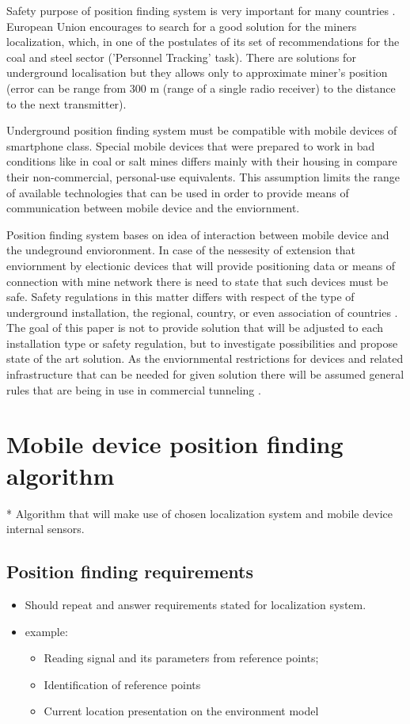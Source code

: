 \documentclass[../main.tex]{subfiles}
\begin{document}
Safety purpose of position finding system is very important for many countries \cite{positioning_tests}. European Union encourages to search for a good solution for the miners localization, which, in one of the postulates of its set of recommendations for the coal and steel sector ('Personnel Tracking' task). There are solutions for underground localisation but they allows only to approximate miner's position (error can be range from 300 m (range of a single radio receiver) to the distance to the next transmitter).

Underground position finding system must be compatible with mobile devices of smartphone class. Special mobile devices that were prepared to work in bad conditions like in coal or salt mines differs mainly with their housing in compare their non-commercial, personal-use equivalents. This assumption limits the range of available technologies that can be used in order to provide means of communication between mobile device and the enviornment.


Position finding system bases on idea of interaction between mobile device and the undeground envioronment. In case of the nessesity of extension that enviornment by electionic devices that will provide positioning data or means of connection with mine network there is need to state that such devices must be safe. Safety regulations in this matter differs with respect of the type of underground installation, the regional, country, or even association of countries \cite{Thesis_CM}. The goal of this paper is not to provide solution that will be adjusted to each installation type or safety regulation, but to investigate possibilities and propose state of the art solution. As the enviornmental restrictions for devices and related infrastructure that can be needed for given solution there will be assumed general rules that are being in use in commercial tunneling \cite{Thesis_CM}.



\chapter{Mobile device position finding algorithm}
* Algorithm that will make use of chosen localization system and mobile device internal sensors.

\section{Position finding requirements} %
\label{sec:position_finding_requirements}
\begin{itemize}
	\item Should repeat and answer requirements stated for localization system.
	\item example:
	\begin{itemize}
		\item Reading signal and its parameters from reference points;
		\item Identification of reference points
		\item Current location presentation on the environment model
	\end{itemize}
\end{itemize}
\end{document}
